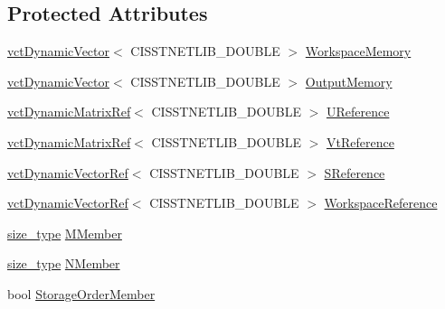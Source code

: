 \subsection*{Protected Attributes}
\begin{DoxyCompactItemize}
\item 
\hyperlink{classvct_dynamic_vector}{vct\+Dynamic\+Vector}$<$ C\+I\+S\+S\+T\+N\+E\+T\+L\+I\+B\+\_\+\+D\+O\+U\+B\+L\+E $>$ \hyperlink{classnmr_s_v_d_dynamic_data_abe50251589c5f7d24ae6d2024f7344f0}{Workspace\+Memory}
\item 
\hyperlink{classvct_dynamic_vector}{vct\+Dynamic\+Vector}$<$ C\+I\+S\+S\+T\+N\+E\+T\+L\+I\+B\+\_\+\+D\+O\+U\+B\+L\+E $>$ \hyperlink{classnmr_s_v_d_dynamic_data_a62cf889a1182a098e665a73f4985a9ba}{Output\+Memory}
\end{DoxyCompactItemize}
{\bf }\par
\begin{DoxyCompactItemize}
\item 
\hyperlink{classvct_dynamic_matrix_ref}{vct\+Dynamic\+Matrix\+Ref}$<$ C\+I\+S\+S\+T\+N\+E\+T\+L\+I\+B\+\_\+\+D\+O\+U\+B\+L\+E $>$ \hyperlink{classnmr_s_v_d_dynamic_data_a2f627a078f4bb1bc05c54f2e3269ae2c}{U\+Reference}
\item 
\hyperlink{classvct_dynamic_matrix_ref}{vct\+Dynamic\+Matrix\+Ref}$<$ C\+I\+S\+S\+T\+N\+E\+T\+L\+I\+B\+\_\+\+D\+O\+U\+B\+L\+E $>$ \hyperlink{classnmr_s_v_d_dynamic_data_a55d8b13fe84f67743291578ce94578b0}{Vt\+Reference}
\item 
\hyperlink{classvct_dynamic_vector_ref}{vct\+Dynamic\+Vector\+Ref}$<$ C\+I\+S\+S\+T\+N\+E\+T\+L\+I\+B\+\_\+\+D\+O\+U\+B\+L\+E $>$ \hyperlink{classnmr_s_v_d_dynamic_data_a695e21e7e405283b5f16b9285c31d5eb}{S\+Reference}
\item 
\hyperlink{classvct_dynamic_vector_ref}{vct\+Dynamic\+Vector\+Ref}$<$ C\+I\+S\+S\+T\+N\+E\+T\+L\+I\+B\+\_\+\+D\+O\+U\+B\+L\+E $>$ \hyperlink{classnmr_s_v_d_dynamic_data_a616c1ec08f23128458db53bbfb1fa0b2}{Workspace\+Reference}
\end{DoxyCompactItemize}

{\bf }\par
\begin{DoxyCompactItemize}
\item 
\hyperlink{classnmr_s_v_d_dynamic_data_ae1d183124f1fe39da05af9cea168101d}{size\+\_\+type} \hyperlink{classnmr_s_v_d_dynamic_data_a80e8b2828a7f24b24a6633bf6caa3ad4}{M\+Member}
\item 
\hyperlink{classnmr_s_v_d_dynamic_data_ae1d183124f1fe39da05af9cea168101d}{size\+\_\+type} \hyperlink{classnmr_s_v_d_dynamic_data_a4096b80ce5ddda1a17c49c4565bf33db}{N\+Member}
\item 
bool \hyperlink{classnmr_s_v_d_dynamic_data_ad8bf7fcd150c906b3f7407b5a91fa51b}{Storage\+Order\+Member}
\end{DoxyCompactItemize}

